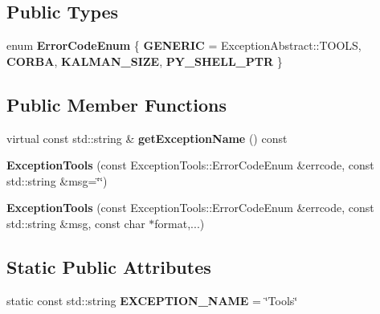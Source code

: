 \subsection*{Public Types}
\begin{DoxyCompactItemize}
\item 
enum {\bfseries Error\+Code\+Enum} \{ {\bfseries G\+E\+N\+E\+R\+IC} = Exception\+Abstract\+:\+:T\+O\+O\+LS, 
{\bfseries C\+O\+R\+BA}, 
{\bfseries K\+A\+L\+M\+A\+N\+\_\+\+S\+I\+ZE}, 
{\bfseries P\+Y\+\_\+\+S\+H\+E\+L\+L\+\_\+\+P\+TR}
 \}\hypertarget{classdynamic__graph_1_1ExceptionTools_a729905d84b61fe0895e80ad13982c9cb}{}\label{classdynamic__graph_1_1ExceptionTools_a729905d84b61fe0895e80ad13982c9cb}

\end{DoxyCompactItemize}
\subsection*{Public Member Functions}
\begin{DoxyCompactItemize}
\item 
virtual const std\+::string \& {\bfseries get\+Exception\+Name} () const \hypertarget{classdynamic__graph_1_1ExceptionTools_ac49cd8336bd09fdff9425b43b1bf1f12}{}\label{classdynamic__graph_1_1ExceptionTools_ac49cd8336bd09fdff9425b43b1bf1f12}

\item 
{\bfseries Exception\+Tools} (const Exception\+Tools\+::\+Error\+Code\+Enum \&errcode, const std\+::string \&msg=\char`\"{}\char`\"{})\hypertarget{classdynamic__graph_1_1ExceptionTools_a215023b7c5fd241bf6493e0025172b22}{}\label{classdynamic__graph_1_1ExceptionTools_a215023b7c5fd241bf6493e0025172b22}

\item 
{\bfseries Exception\+Tools} (const Exception\+Tools\+::\+Error\+Code\+Enum \&errcode, const std\+::string \&msg, const char $\ast$format,...)\hypertarget{classdynamic__graph_1_1ExceptionTools_afdd3f8be1a238814b6d676ed72e7bfb6}{}\label{classdynamic__graph_1_1ExceptionTools_afdd3f8be1a238814b6d676ed72e7bfb6}

\end{DoxyCompactItemize}
\subsection*{Static Public Attributes}
\begin{DoxyCompactItemize}
\item 
static const std\+::string {\bfseries E\+X\+C\+E\+P\+T\+I\+O\+N\+\_\+\+N\+A\+ME} = \char`\"{}Tools\char`\"{}\hypertarget{classdynamic__graph_1_1ExceptionTools_a80e1cf0e61c8a570e9dfc65be97efc0c}{}\label{classdynamic__graph_1_1ExceptionTools_a80e1cf0e61c8a570e9dfc65be97efc0c}

\end{DoxyCompactItemize}
